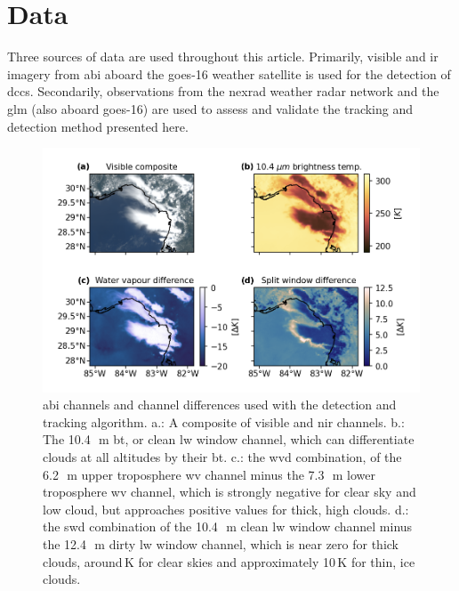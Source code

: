 

\section{Data}

Three sources of data are used throughout this article.
Primarily, visible and \acrshort{ir} imagery from \acrshort{abi} aboard the \acrshort{goes}-16 weather satellite is used for the detection of \acrshort{dcc}s.
Secondarily, observations from the \acrshort{nexrad} weather radar network and the \acrshort{glm} (also aboard \acrshort{goes}-16) are used to assess and validate the tracking and detection method presented here.

\begin{figure}[t]
    \includegraphics[width=\textwidth]{figures/chapter1_03.png}
    \caption[
    \acrshort{abi} channels and channel differences used with the detection and tracking algorithm
    ]{
    \acrshort{abi} channels and channel differences used with the detection and tracking algorithm. a.: A composite of visible and \acrshort{nir} channels. b.: The 10.4\,\unit{\mu m} \acrshort{bt}, or clean \acrshort{lw} window channel, which can differentiate clouds at all altitudes by their \acrshort{bt}. c.: the \acrshort{wvd} combination, of the 6.2\,\unit{\mu m} upper troposphere \acrshort{wv} channel minus the 7.3\,\unit{\mu m} lower troposphere \acrshort{wv} channel, which is strongly negative for clear sky and low cloud, but approaches positive values for thick, high clouds. d.: the \acrshort{swd} combination of the 10.4\,\unit{\mu m} clean \acrshort{lw} window channel minus the 12.4\,\unit{\mu m} dirty \acrshort{lw} window channel, which is near zero for thick clouds, around\,\unit{K} for clear skies and approximately 10\,\unit{K} for thin, ice clouds.
    }
    \label{fig:abi_channels}
\end{figure}

